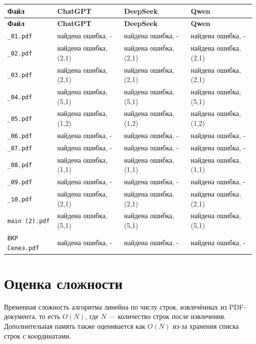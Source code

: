 \begin{longtable}{|p{}|p{}|p{}|p{}|}
\hline
\textbf{Файл} & \textbf{ChatGPT} & \textbf{DeepSeek} & \textbf{Qwen} \\
\hline
\endfirsthead
\hline
\textbf{Файл} & \textbf{ChatGPT} & \textbf{DeepSeek} & \textbf{Qwen} \\
\hline
\endhead

\texttt{\_01.pdf} & найдена ошибка, - & найдена ошибка, - & найдена ошибка, - \\ \hline
\texttt{\_02.pdf} & найдена ошибка, (2,1) & найдена ошибка, (2,1) & найдена ошибка, (2,1) \\ \hline
\texttt{\_03.pdf} & найдена ошибка, (2,1) & найдена ошибка, (2,1) & найдена ошибка, (2,1) \\ \hline
\texttt{\_04.pdf} & найдена ошибка, (5,1) & найдена ошибка, (5,1) & найдена ошибка, (5,1) \\ \hline
\texttt{\_05.pdf} & найдена ошибка, (1,2) & найдена ошибка, (1,2) & найдена ошибка, (1,2) \\ \hline
\texttt{\_06.pdf} & найдена ошибка, - & найдена ошибка, - & найдена ошибка, - \\ \hline
\texttt{\_07.pdf} & найдена ошибка, - & найдена ошибка, - & найдена ошибка, - \\ \hline
\texttt{\_08.pdf} & найдена ошибка, (1,1) & найдена ошибка, (1,1) & найдена ошибка, (1,1) \\ \hline
\texttt{\_09.pdf} & найдена ошибка, - & найдена ошибка, - & найдена ошибка, - \\ \hline
\texttt{\_10.pdf} & найдена ошибка, (2,1) & найдена ошибка, (2,1) & найдена ошибка, (2,1) \\ \hline
\texttt{main (2).pdf} & найдена ошибка, (5,1) & найдена ошибка, (5,1) & найдена ошибка, (5,1) \\ \hline
\texttt{ВКР Селез.pdf} & найдена ошибка, - & найдена ошибка, - & найдена ошибка, - \\ \hline

\end{longtable}

\section{Оценка сложности}

Временная сложность алгоритма линейна по числу строк, извлечённых из PDF-документа,
то есть $O(N)$, где $N$ — количество строк после извлечения.
Дополнительная память также оценивается как $O(N)$ из-за хранения списка строк с координатами.

